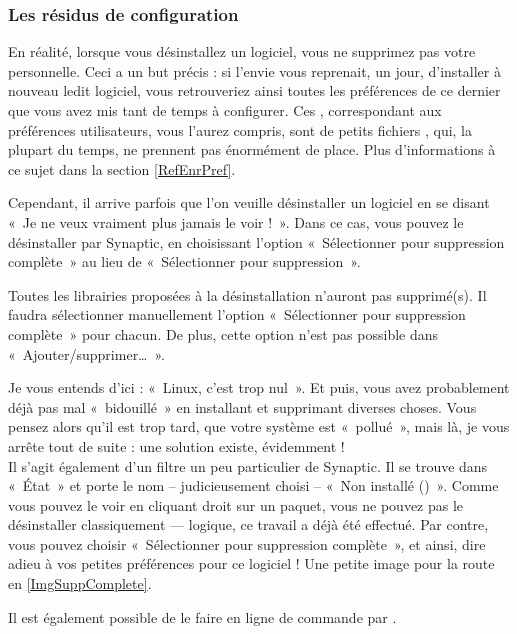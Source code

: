 {\subsubsection{Les résidus de configuration}
En réalité, lorsque vous désinstallez un logiciel, vous ne supprimez pas votre  personnelle. Ceci a un but précis : si l'envie vous reprenait, un jour, d'installer à nouveau ledit logiciel, vous retrouveriez ainsi toutes les préférences de ce dernier que vous avez mis tant de temps à configurer. Ces , correspondant aux préférences utilisateurs, vous l'aurez compris, sont de petits fichiers , qui, la plupart du temps, ne prennent pas énormément de place. Plus d'informations à ce sujet dans la section \ref{RefEnrPref}.\par
Cependant, il arrive parfois que l'on veuille désinstaller un logiciel en se disant «~Je ne veux vraiment plus jamais le voir !~». Dans ce cas, vous pouvez le désinstaller par Synaptic, en choisissant l'option «~Sélectionner pour suppression complète~» au lieu de «~Sélectionner pour suppression~».
\begin{attention}
Toutes les librairies proposées à la désinstallation n'auront pas  supprimé(s). Il faudra sélectionner manuellement l'option «~Sélectionner pour suppression complète~» pour chacun. De plus, cette option n'est pas possible dans «~Ajouter/supprimer\dots{}~».
\end{attention}\par
Je vous entends d'ici : «~Linux, c'est trop nul~». Et puis, vous avez probablement déjà pas mal «~bidouillé~» en installant et supprimant diverses choses. Vous pensez alors qu'il est trop tard, que votre système est «~pollué~», mais là, je vous arrête tout de suite : une solution existe, évidemment !\\
Il s'agit également d'un filtre un peu particulier de Synaptic. Il se trouve dans «~État~» et porte le nom -- judicieusement choisi -- «~Non installé ()~». Comme vous pouvez le voir en cliquant droit sur un paquet, vous ne pouvez pas le désinstaller classiquement --- logique, ce travail a déjà été effectué. Par contre, vous pouvez choisir «~Sélectionner pour suppression complète~», et ainsi, dire adieu à vos petites préférences pour ce logiciel ! Une petite image pour la route en \ref{ImgSuppComplete}.
\begin{nota}
Il est également possible de le faire en ligne de commande par  .
\end{nota}
}
